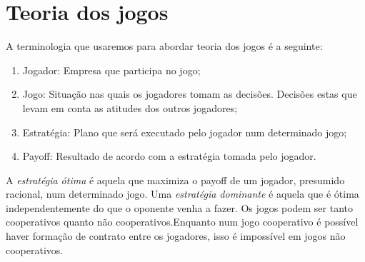\documentclass[12pt,a4paper,oneside,brazil]{abntex2}
\begin{document}
\section{Teoria dos jogos}
A terminologia que usaremos para abordar teoria dos jogos é a seguinte:

\begin{enumerate}
	\item Jogador: Empresa que participa no jogo;
	\item Jogo: Situação nas quais os jogadores tomam as decisões. Decisões estas que levam em conta as atitudes dos outros jogadores;
	\item Estratégia: Plano que será executado pelo jogador num determinado jogo;
	\item Payoff: Resultado de acordo com a estratégia tomada pelo jogador.
\end{enumerate}

A \emph{estratégia ótima} é aquela que maximiza o payoff de um jogador, presumido racional, num determinado jogo. Uma \emph{estratégia dominante} é aquela que é ótima independentemente do que o oponente venha a fazer. Os jogos podem ser tanto cooperativos quanto não cooperativos.Enquanto num jogo cooperativo é possível haver formação de contrato entre os jogadores, isso é impossível em jogos não cooperativos.
\end{document}

